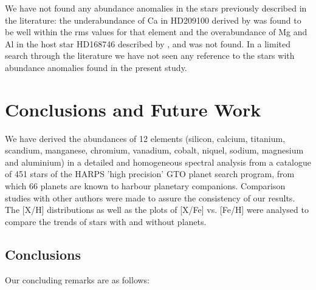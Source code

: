 \documentclass[dvips,12pt,a4paper]{report}
\begin{document}
{{We have not found any abundance anomalies in the stars previously described in the literature: the underabundance of Ca in HD209100 derived by \citet{Bodaghee-2003} was found to be well within the rms values for that element and the overabundance of Mg and Al in the host star HD168746 described by \citet{Sadakane-2002}, \citet{Laws-2003} and \citet{Gilli-2006}  was not found. In a limited search through the literature we have not seen any reference to the stars with abundance anomalies found in the present study.

\chapter{Conclusions and Future Work}

We have derived the abundances of 12 elements (silicon, calcium, titanium, scandium, manganese, chromium, vanadium, cobalt, niquel, sodium, magnesium and aluminium) in a detailed and homogeneous spectral analysis from a catalogue of 451 stars of the HARPS 'high precision' GTO planet search program, from which 66 planets are known to harbour planetary companions. Comparison studies with other authors were made to assure the consistency of our results. The [X/H] distributions as well as the plots of [X/Fe] vs. [Fe/H] were analysed to compare the trends of stars with and without planets. 

\section {Conclusions}

Our concluding remarks are as follows:

\begin{itemize}
 

\end{itemize}}}
\end{document}
